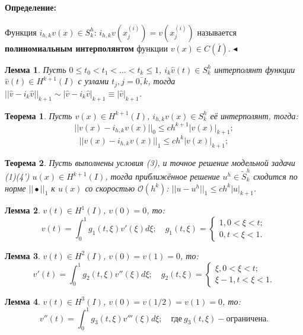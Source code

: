 \documentclass{article}
\newtheorem{theorem}{Теорема}
\newtheorem{lemma}{Лемма}
\newenvironment{definition}{ \paragraph{Определение:}}{\hfill $\blacktriangleleft$}
\begin{document}
\begin{definition}
	Функция $i_{h,k} v(x) \in S_k^h$: $i_{h,k} v(x_j^{(i)})= v(x_j^{(i)})$ называется \textbf{полиномиальным интерполянтом} функции $v(x) \in C(\overline{I})$.
\end{definition}

\begin{lemma}
	Пусть $0 \leqslant t_0 < t_1 < ... < t_k \leqslant 1$, $i_k \hat{v}(t) \in S_k^h$ интерполянт функции $\hat{v}(t) \in H^{k+1}(I)$ с узлами $t_j, j = \overline{0,k}$, тогда $||\hat{v} - i_k \hat{v}||_{k+1} \sim |\hat{v} - i_k \hat{v}|_{k+1} \equiv |\hat{v}|_{k+1}$.
\end{lemma}

\begin{theorem}
	Пусть $v(x) \in H^{k+1}(I)$, $i_{h,k} v(x) \in S_k^h$ её интерполянт, тогда:
	\[
	||v(x) - i_{h,k} v(x)||_0 \leqslant c h^{k+1} |v(x)|_{k+1};	
	\]
	\[
	||v(x) - i_{h,k} v(x)||_1 \leqslant c h^{k} |v(x)|_{k+1};	
	\]
\end{theorem}

\begin{theorem}
	Пусть выполнены условия (3), и точное решение модельной задачи (1)(4') $u(x) \in H^{k+1}(I)$, тогда приближённое решение $u^h \in \tilde{S}_k^h$ сходится по норме $||\bullet||_1$ к $u(x)$ со скоростью $\mathcal{O}(h^k)$: $||u-u^h||_1 \leqslant c h^k |u|_{k+1}$.
\end{theorem}

\begin{lemma}
	$v(t) \in H^1(I)$, $v(0) = 0$, то:
	\[
	v(t) = \int_0^1 g_1(t,\xi) v'(\xi) d\xi; \quad g_1(t,\xi) = 
	\begin{cases}
	1, 0 < \xi < t;\\
	0, t < \xi < 1.
	\end{cases}	
	\]
\end{lemma}

\begin{lemma}
	$v(t) \in H^2(I)$, $v(0) = v(1) = 0$, то:
	\[
	v'(t) = \int_0^1 g_2(t,\xi) v''(\xi) d\xi; \quad g_2(t,\xi) = 
	\begin{cases}
	\xi, 0 < \xi < t;\\
	\xi - 1, t < \xi < 1.
	\end{cases}	
	\]
\end{lemma}

\begin{lemma}
	$v(t) \in H^3(I)$, $v(0) = v(1/2) = v(1) = 0$, то:
	\[
	v''(t) = \int_0^1 g_3(t,\xi) v'''(\xi) d\xi; \quad \text{где} \ g_3(t,\xi) - \text{ограничена}.
	\]
\end{lemma}
\end{document}
